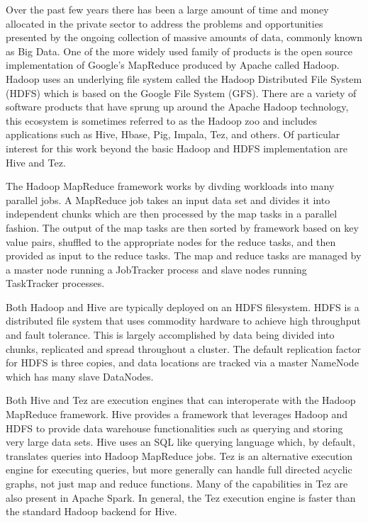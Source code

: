 \documentclass[11pt,twoside]{article}
\begin{document}
Over the past few years there has been a large amount of time and money allocated in the private sector to
address the problems and opportunities presented by the ongoing collection of massive amounts of data,
commonly known as Big Data. One of the more widely used family of products is the open source implementation
of Google's MapReduce produced by Apache called Hadoop\cite{ref:hadoop}. Hadoop uses an underlying file system called the
Hadoop Distributed File System (HDFS) which is based on the Google File System (GFS). There are a variety of
software products that have sprung up around the Apache Hadoop technology, this ecosystem is sometimes
referred to as the Hadoop zoo and includes applications such as Hive, Hbase, Pig, Impala, Tez, and others. Of
particular interest for this work beyond the basic Hadoop and HDFS implementation are Hive and Tez.

The Hadoop MapReduce framework works by divding workloads into many parallel jobs. A MapReduce job takes an
input data set and divides it into independent chunks which are then processed by the map tasks in a parallel
fashion. The output of the map tasks are then sorted by framework based on key value pairs, shuffled to the
appropriate nodes for the reduce tasks, and then provided as input to the reduce tasks. The map and reduce
tasks are managed by a master node running a JobTracker process and slave nodes running TaskTracker processes.

Both Hadoop and Hive are typically deployed on an HDFS filesystem. HDFS is a distributed file system that uses
commodity hardware to achieve high throughput and fault tolerance. This is largely accomplished by data being
divided into chunks, replicated and spread throughout a cluster. The default replication factor for HDFS is
three copies, and data locations are tracked via a master NameNode which has many slave DataNodes. 

Both Hive and Tez are execution engines that can interoperate with the Hadoop MapReduce framework. Hive
provides a framework that leverages Hadoop and HDFS to provide data warehouse functionalities such as querying
and storing very large data sets. Hive uses an SQL like querying language which, by default, translates
queries into Hadoop MapReduce jobs. Tez is an alternative execution engine for executing queries, but more
generally can handle full directed acyclic graphs, not just map and reduce functions. Many of the capabilities
in Tez are also present in Apache Spark. In general, the Tez execution engine is faster than the standard
Hadoop backend for Hive. 
\end{document}
